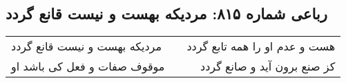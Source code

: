 \begin{center}
\section*{رباعی شماره ۸۱۵: مردیکه بهست و نیست قانع گردد}
\label{sec:0815}
\begin{longtable}{l p{0.5cm} r}
مردیکه بهست و نیست قانع گردد
&&
هست و عدم او را همه تابع گردد
\\
موقوف صفات و فعل کی باشد او
&&
کز صنع برون آید و صانع گردد
\\
\end{longtable}
\end{center}

